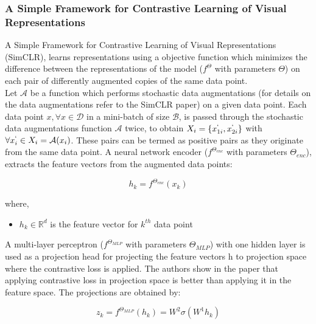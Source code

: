 \subsubsection{A Simple Framework for Contrastive Learning of Visual Representations
\cite{chen2020}}
A Simple Framework for Contrastive Learning of Visual Representations (SimCLR), learns representations using a objective function which minimizes the difference between the representations of the model ($f^\Theta$ with parameters $\Theta$) on each pair of differently augmented copies of the same data point. \\
Let $\mathcal{A}$ be a function which performs stochastic data augmentations (for details on the data augmentations refer to the SimCLR paper) on a given data point. Each data point $x, \forall x \in \mathcal{D}$ in a mini-batch of size $\mathcal{B}$, is passed through the stochastic data augmentations function $\mathcal{A}$ twice, to obtain $X_i = \{x_{1i}^{`}, x_{2i}^{`}\}$ with $\forall x_i^{`} \in X_i = \mathcal{A}(x_i)$. These pairs can be termed as positive pairs as they originate from the same data point. A neural network encoder ($f^{\Theta_{enc}}$ with parameters $\Theta_{enc}$), extracts the feature vectors from the augmented data points:

\begin{equation}
    \label{equation:simclr_encoder}
    h_k = f^{\Theta_{enc}}(x_k)
\end{equation}

where,
\begin{itemize}[label={}]
  \setlength\itemsep{0em}
  \item $h_k \in \mathbb{R}^{d}$ is the feature vector for $k^{th}$ data point
\end{itemize}

A multi-layer perceptron ($f^{\Theta_{MLP}}$ with parameters $\Theta_{MLP}$) with one hidden layer is used as a projection head for projecting the feature vectors h to projection space where the contrastive loss is applied. The authors show in the paper that applying contrastive loss in projection space is better than applying it in the feature space. The projections are obtained by:

\begin{equation}
    \label{equation:simclr_mlp}
    z_k = f^{\Theta_{MLP}}(h_k) = W^{2}\sigma(W^{1}h_k)
\end{equation}

